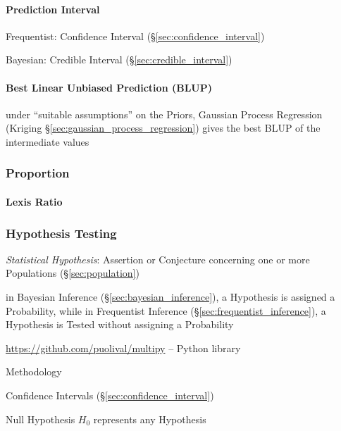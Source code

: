 \paragraph{Prediction Interval}\label{sec:prediction_interval}\hfill

Frequentist: Confidence Interval (\S\ref{sec:confidence_interval})

Bayesian: Credible Interval (\S\ref{sec:credible_interval})



\paragraph{Best Linear Unbiased Prediction (BLUP)}\label{sec:blup}\hfill

under ``suitable assumptions'' on the Priors, Gaussian Process Regression
(Kriging \S\ref{sec:gaussian_process_regression}) gives the best BLUP of the
intermediate values



\subsubsection{Proportion}\label{sec:statistical_proportion}

\paragraph{Lexis Ratio}\label{sec:lexis_ratio}\hfill



\subsubsection{Hypothesis Testing}\label{sec:hypothesis_testing}

\emph{Statistical Hypothesis}: Assertion or Conjecture concerning one or more
Populations (\S\ref{sec:population})

in Bayesian Inference (\S\ref{sec:bayesian_inference}), a Hypothesis is assigned
a Probability, while in Frequentist Inference
(\S\ref{sec:frequentist_inference}), a Hypothesis is Tested without assigning a
Probability

\url{https://github.com/puolival/multipy} -- Python library

Methodology

Confidence Intervals (\S\ref{sec:confidence_interval})

Null Hypothesis $H_0$ represents any Hypothesis

